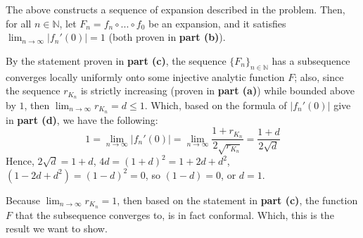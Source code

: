 \documentclass{article}
\begin{document}
\begin{itemize}
    The above constructs a sequence of expansion described in the problem. Then, for all $n\in\mathbb{N}$, let $F_n=f_n\circ...\circ f_0$ be an expansion, and it satisfies $\lim_{n\rightarrow\infty}|f_n'(0)|=1$ (both proven in \textbf{part (b)}).

    By the statement proven in \textbf{part (c)}, the sequence $\{F_n\}_{n\in\mathbb{N}}$ has a subsequence converges locally uniformly onto some injective analytic function $F$; also, since the sequence $r_{K_n}$ is strictly increasing (proven in \textbf{part (a)}) while bounded above by $1$,
    then $\lim_{n\rightarrow\infty}r_{K_n}=d\leq 1$. Which, based on the formula of $|f_n'(0)|$ give in \textbf{part (d)}, we have the following:
    $$1=\lim_{n\rightarrow\infty}|f_n'(0)|=\lim_{n\rightarrow\infty}\frac{1+r_{K_n}}{2\sqrt{r_{K_n}}} = \frac{1+d}{2\sqrt{d}}$$
    Hence, $2\sqrt{d}=1+d$, $4d=(1+d)^2=1+2d+d^2$, $(1-2d+d^2)=(1-d)^2=0$, so $(1-d)=0$, or $d=1$.

    Because $\lim_{n\rightarrow\infty}r_{K_n}=1$, then based on the statement in \textbf{part (c)}, the function $F$ that the subsequence converges to, is in fact conformal.
    Which, this is the result we want to show.
\end{itemize}
\end{document}

